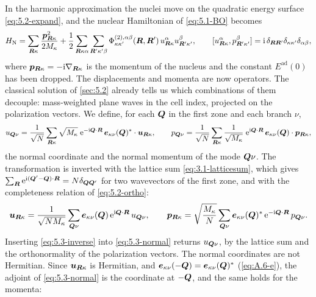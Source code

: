 In the harmonic approximation the nuclei move on the quadratic energy surface \cref{eq:5.2-expand}, and the nuclear Hamiltonian of \cref{eq:5.1-BO} becomes
\begin{equation}
  H_{\mathrm{N}} = \sum_{\bm{R}\kappa}\frac{\bm{p}_{\bm{R}\kappa}^2}{2M_\kappa}
  + \frac12\sum_{\bm{R}\kappa\alpha}\sum_{\bm{R}'\kappa'\beta}\Phi^{(2),\alpha\beta}_{\kappa\kappa'}(\bm{R},\bm{R}')\,u^\alpha_{\bm{R}\kappa}u^\beta_{\bm{R}'\kappa'} ,
  \qquad
  [u^\alpha_{\bm{R}\kappa}, p^\beta_{\bm{R}'\kappa'}] = \mathrm{i}\,\delta_{\bm{R}\bm{R}'}\delta_{\kappa\kappa'}\delta_{\alpha\beta} ,
  \label{eq:5.3-H}
\end{equation}
where $\bm{p}_{\bm{R}\kappa} = -\mathrm{i}\nabla_{\bm{R}\kappa}$ is the momentum of the nucleus and the constant $E^{\mathrm{ad}}(0)$ has been dropped. The displacements and momenta are now operators. The classical solution of \cref{sec:5.2} already tells us which combinations of them decouple: mass-weighted plane waves in the cell index, projected on the polarization vectors. We define, for each $\bm{Q}$ in the first zone and each branch $\nu$,
\begin{equation}
  u_{\bm{Q}\nu} = \frac{1}{\sqrt N}\sum_{\bm{R}\kappa}\sqrt{M_\kappa}\;\mathrm{e}^{-\mathrm{i}\bm{Q}\cdot\bm{R}}\,\bm{e}_{\kappa\nu}(\bm{Q})^*\cdot\bm{u}_{\bm{R}\kappa} , \qquad
  p_{\bm{Q}\nu} = \frac{1}{\sqrt N}\sum_{\bm{R}\kappa}\frac{1}{\sqrt{M_\kappa}}\;\mathrm{e}^{\mathrm{i}\bm{Q}\cdot\bm{R}}\,\bm{e}_{\kappa\nu}(\bm{Q})\cdot\bm{p}_{\bm{R}\kappa} ,
  \label{eq:5.3-normal}
\end{equation}
the normal coordinate and the normal momentum of the mode $\bm{Q}\nu$. The transformation is inverted with the lattice sum \cref{eq:3.1-latticesum}, which gives $\sum_{\bm{R}}\mathrm{e}^{\mathrm{i}(\bm{Q}' - \bm{Q})\cdot\bm{R}} = N\delta_{\bm{Q}\bm{Q}'}$ for two wavevectors of the first zone, and with the completeness relation of \cref{eq:5.2-ortho}:
\begin{equation}
  \bm{u}_{\bm{R}\kappa} = \frac{1}{\sqrt{NM_\kappa}}\sum_{\bm{Q}\nu}\bm{e}_{\kappa\nu}(\bm{Q})\,\mathrm{e}^{\mathrm{i}\bm{Q}\cdot\bm{R}}\,u_{\bm{Q}\nu} , \qquad
  \bm{p}_{\bm{R}\kappa} = \sqrt{\frac{M_\kappa}{N}}\sum_{\bm{Q}\nu}\bm{e}_{\kappa\nu}(\bm{Q})^*\,\mathrm{e}^{-\mathrm{i}\bm{Q}\cdot\bm{R}}\,p_{\bm{Q}\nu} .
  \label{eq:5.3-inverse}
\end{equation}
Inserting \cref{eq:5.3-inverse} into \cref{eq:5.3-normal} returns $u_{\bm{Q}\nu}$, by the lattice sum and the orthonormality of the polarization vectors. The normal coordinates are not Hermitian. Since $\bm{u}_{\bm{R}\kappa}$ is Hermitian, and $\bm{e}_{\kappa\nu}(-\bm{Q}) = \bm{e}_{\kappa\nu}(\bm{Q})^*$ (\cref{eq:A.6-e}), the adjoint of \cref{eq:5.3-normal} is the coordinate at $-\bm{Q}$, and the same holds for the momenta:
